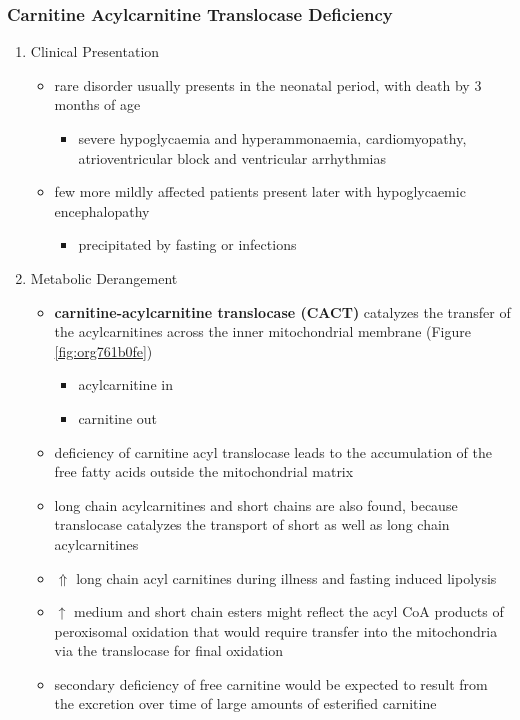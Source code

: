 \documentclass[12pt]{scrartcl}
\begin{document}
\subsubsection{Carnitine Acylcarnitine Translocase Deficiency}
\label{sec:orgad4f654}
\begin{enumerate}
\item Clinical Presentation
\label{sec:orge634781}
\begin{itemize}
\item rare disorder usually presents in the neonatal period, with
death by 3 months of age
\begin{itemize}
\item severe hypoglycaemia and hyperammonaemia, cardiomyopathy,
atrioventricular block and ventricular arrhythmias
\end{itemize}
\item few more mildly affected patients present later with hypoglycaemic
encephalopathy
\begin{itemize}
\item precipitated by fasting or infections
\end{itemize}
\end{itemize}
\item Metabolic Derangement
\label{sec:org7688143}
\begin{itemize}
\item \textbf{carnitine-acylcarnitine translocase (CACT)} catalyzes the transfer
of the acylcarnitines across the inner mitochondrial membrane
(Figure \ref{fig:org761b0fe})
\begin{itemize}
\item acylcarnitine in
\item carnitine out
\end{itemize}
\item deficiency of carnitine acyl translocase leads to the accumulation
of the free fatty acids outside the mitochondrial matrix
\item long chain acylcarnitines and short chains are also found, because
translocase catalyzes the transport of short as well as long chain
acylcarnitines
\item \(\Uparrow\) long chain acyl carnitines during illness and fasting
induced lipolysis
\item \(\uparrow\) medium and short chain esters might reflect the acyl CoA products
of peroxisomal oxidation that would require transfer into the
mitochondria via the translocase for final oxidation
\item secondary deficiency of free carnitine would be expected to result
from the excretion over time of large amounts of esterified
carnitine
\end{itemize}


\end{enumerate}
\end{document}
